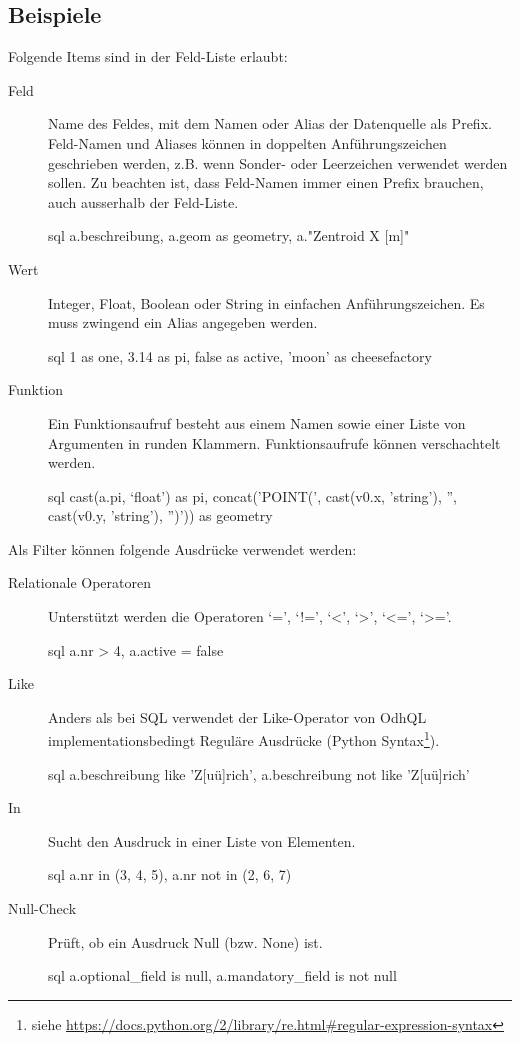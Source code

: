 \subsection{Beispiele}
Folgende Items sind in der Feld-Liste erlaubt:
\begin{description}
\item[Feld] Name des Feldes, mit dem Namen oder Alias der Datenquelle als Prefix. Feld-Namen und Aliases können in doppelten Anführungszeichen geschrieben werden, z.B. wenn Sonder- oder Leerzeichen verwendet werden sollen. Zu beachten ist, dass Feld-Namen immer einen Prefix brauchen, auch ausserhalb der Feld-Liste.
\begin{src}{sql}
a.beschreibung, a.geom as geometry, a."Zentroid X [m]"
\end{src}
\item[Wert] Integer, Float, Boolean oder String in einfachen Anführungszeichen. Es muss zwingend ein Alias angegeben werden. 
\begin{src}{sql}
1 as one, 3.14 as pi, false as active, 'moon' as cheesefactory
\end{src}
\item[Funktion] Ein Funktionsaufruf besteht aus einem Namen sowie einer Liste von Argumenten in runden Klammern. Funktionsaufrufe können verschachtelt werden.
\begin{src}{sql}
 cast(a.pi, `float') as pi,
 concat('POINT(', cast(v0.x, 'string'), '', cast(v0.y, 'string'), '')')) as geometry
\end{src}
\end{description}

Als Filter können folgende Ausdrücke verwendet werden:
\begin{description}
\item[Relationale Operatoren] Unterstützt werden die Operatoren `=', `!=', `<', `>', `<=', `>='.
\begin{src}{sql}
a.nr > 4, a.active = false
\end{src}
\item[Like] Anders als bei SQL verwendet der Like-Operator von OdhQL implementationsbedingt Reguläre Ausdrücke (Python Syntax\footnote{siehe \url{https://docs.python.org/2/library/re.html\#regular-expression-syntax}}).
\begin{src}{sql}
a.beschreibung like 'Z[uü]rich', a.beschreibung not like 'Z[uü]rich'
\end{src}
\item[In] Sucht den Ausdruck in einer Liste von Elementen.
\begin{src}{sql}
a.nr in (3, 4, 5), a.nr not in (2, 6, 7)
\end{src}
\item[Null-Check] Prüft, ob ein Ausdruck Null (bzw. None) ist.
\begin{src}{sql}
a.optional_field is null, a.mandatory_field is not null
\end{src}
\end{description}

